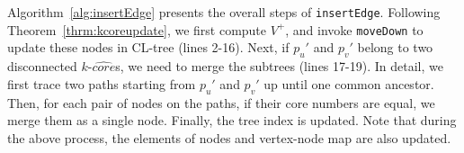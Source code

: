 Algorithm~\ref{alg:insertEdge} presents the overall steps of {\tt insertEdge}.
Following Theorem~\ref{thrm:kcoreupdate}, we first compute $V^+$,
and invoke {\tt moveDown} to update these nodes in CL-tree (lines 2-16).
Next, if $p_u'$ and $p_v'$ belong to two disconnected $k$-$\widehat{core}$s, we need to merge the subtrees (lines 17-19).
In detail, we first trace two paths starting from $p_u'$ and $p_v'$ up until one common ancestor.
Then, for each pair of nodes on the paths, if their core numbers are equal,
we merge them as a single node.
Finally, the tree index is updated.
Note that during the above process, the elements of nodes and vertex-node map are also updated.


